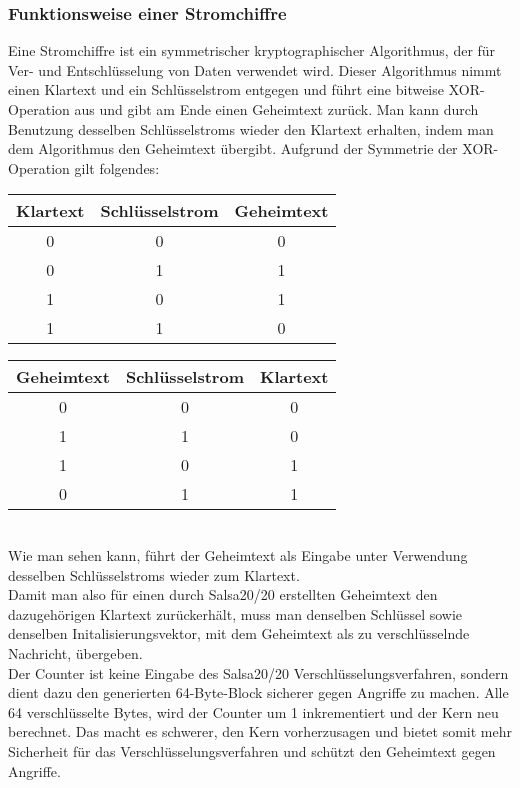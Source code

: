 \documentclass[course=erap]{aspdoc}
\begin{document}
\subsubsection{Funktionsweise einer Stromchiffre}
Eine Stromchiffre ist ein symmetrischer kryptographischer Algorithmus, der für Ver- und Entschlüsselung von Daten verwendet wird.
Dieser Algorithmus nimmt einen Klartext und ein Schlüsselstrom entgegen und führt eine bitweise XOR-Operation aus und gibt am Ende
einen Geheimtext zurück.
Man kann durch Benutzung desselben Schlüsselstroms wieder den Klartext erhalten, indem man dem Algorithmus den Geheimtext übergibt.
Aufgrund der Symmetrie der XOR-Operation gilt folgendes:
\begin{table}[!h]
    \begin{tabular}{|c|c|c|}
        \hline
        Klartext & Schlüsselstrom & Geheimtext \\
        \hline
        0        & 0              & 0          \\
        0        & 1              & 1          \\
        1        & 0              & 1          \\
        1        & 1              & 0          \\
        \hline
    \end{tabular}
    \begin{tabular}{|c|c|c|}
        \hline
        Geheimtext & Schlüsselstrom & Klartext \\
        \hline
        0          & 0              & 0        \\
        1          & 1              & 0        \\
        1          & 0              & 1        \\
        0          & 1              & 1        \\
        \hline
    \end{tabular}
\end{table}
\\
Wie man sehen kann, führt der Geheimtext als Eingabe unter Verwendung desselben Schlüsselstroms wieder zum Klartext.
\vspace{3mm}
\\
Damit man also für einen durch Salsa20/20 erstellten Geheimtext den dazugehörigen Klartext zurückerhält,
muss man denselben Schlüssel sowie denselben Initalisierungsvektor, mit dem Geheimtext als zu verschlüsselnde Nachricht, übergeben.
\\
Der Counter ist keine Eingabe des Salsa20/20 Verschlüsselungsverfahren, sondern dient dazu den generierten 64-Byte-Block sicherer gegen Angriffe zu machen. 
Alle 64 verschlüsselte Bytes, wird der Counter um 1 inkrementiert und der Kern neu berechnet. Das macht es schwerer, den Kern vorherzusagen und bietet somit mehr Sicherheit für das Verschlüsselungsverfahren und schützt den Geheimtext gegen Angriffe.
\end{document}
